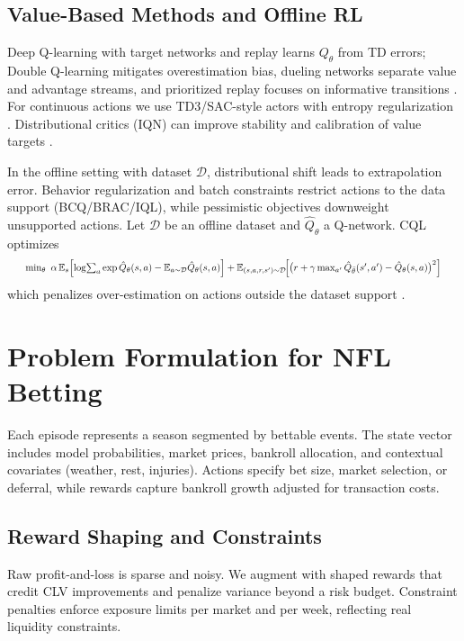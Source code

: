 \subsection{Value-Based Methods and Offline RL}\label{subsec:cql}
Deep Q-learning with target networks and replay learns $Q_\theta$ from TD errors; Double Q-learning mitigates overestimation bias, dueling networks separate value and advantage streams, and prioritized replay focuses on informative transitions \citep{vanhasselt2016,wang2016dueling,schaul2016per}. For continuous actions we use TD3/SAC-style actors with entropy regularization \citep{fujimoto2018td3,haarnoja2018sac}. Distributional critics (IQN) can improve stability and calibration of value targets \citep{bellemare2017distributional,dabney2018quantile}.

In the offline setting with dataset $\mathcal D$, distributional shift leads to extrapolation error. Behavior regularization and batch constraints restrict actions to the data support (BCQ/BRAC/IQL), while pessimistic objectives downweight unsupported actions.
Let $\mathcal{D}$ be an offline dataset and $\hat Q_\theta$ a Q-network. CQL optimizes
\begin{equation*}
\resizebox{0.96\linewidth}{!}{$
\min_\theta\ \alpha\,\E_s\!\left[\log\!\sum_a \exp\hat Q_\theta(s,a) - \E_{a\sim\mathcal{D}} \hat Q_\theta(s,a)\right]
+ \E_{(s,a,r,s')\sim\mathcal{D}}\!\Big[\big(r+\gamma \max_{a'}\hat Q_{\bar\theta}(s',a')-\hat Q_\theta(s,a)\big)^2\Big]
$}
\end{equation*}
which penalizes over-estimation on actions outside the dataset support \citep{fujimoto2019,kumar2019bear,kumar2020,wu2019brac,kostrikov2021iql,levine2020,agarwal2020offline}.

\section{Problem Formulation for NFL Betting}
Each episode represents a season segmented by bettable events. The state vector includes model probabilities, market prices, bankroll allocation, and contextual covariates (weather, rest, injuries). Actions specify bet size, market selection, or deferral, while rewards capture bankroll growth adjusted for transaction costs.

\subsection{Reward Shaping and Constraints}
Raw profit-and-loss is sparse and noisy. We augment with shaped rewards that credit CLV improvements and penalize variance beyond a risk budget. Constraint penalties enforce exposure limits per market and per week, reflecting real liquidity constraints.

